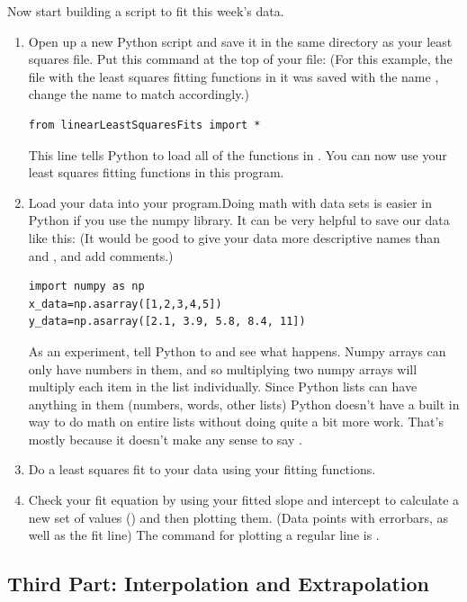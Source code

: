 \documentclass[twoside,11pt,ShortChapTitles]{BYUTextbook}
\begin{document}
Now start building a script to fit this week's data.
\begin{enumerate}
\item Open up a new Python script and save it in the same directory as your least squares file.  Put this command at the top of your file: (For this example, the file with the least squares fitting functions in it was saved with the name , change the name to match accordingly.)
\begin{Verbatim}
from linearLeastSquaresFits import *
\end{Verbatim}
This line tells Python to load all of the functions in .  You can now use your least squares fitting functions in this program.

\item Load your data into your program.Doing math with data sets is easier in Python if you use the numpy library.  It can be very helpful to save our data like this: (It would be good to give your data more descriptive names than  and , and add comments.)
\begin{Verbatim}
import numpy as np
x_data=np.asarray([1,2,3,4,5])
y_data=np.asarray([2.1, 3.9, 5.8, 8.4, 11])
\end{Verbatim}
As an experiment, tell Python to  and see what happens.    Numpy arrays can only have numbers in them, and so multiplying two numpy arrays will multiply each item in the list individually.  Since Python lists can have anything in them (numbers, words, other lists) Python doesn't have a built in way to do math on entire lists without doing quite a bit more work.  That's mostly because it doesn't make any sense to say .

\item Do a least squares fit to your data using your fitting functions.

\item Check your fit equation by using your fitted slope and intercept to
calculate a new set of  values () and then plotting them. (Data points with errorbars, as well as the fit line) The  command for plotting a regular line is .


\end{enumerate}

\subsection{Third Part: Interpolation and Extrapolation}
\end{document}
